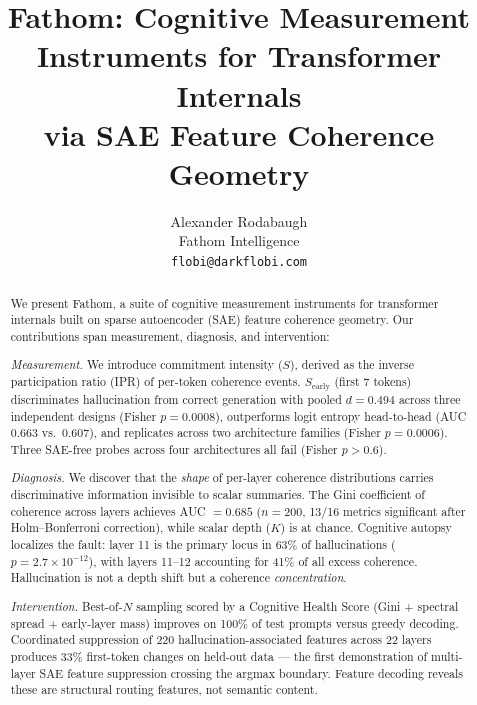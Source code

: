 \documentclass{article}
\title{Fathom: Cognitive Measurement Instruments for Transformer Internals \\
via SAE Feature Coherence Geometry}
\author{
  Alexander Rodabaugh \\
  Fathom Intelligence \\
  \texttt{flobi@darkflobi.com}
}
\begin{document}
\maketitle

\begin{abstract}
We present Fathom, a suite of cognitive measurement instruments
for transformer internals built on sparse autoencoder (SAE) feature
coherence geometry. Our contributions span measurement, diagnosis,
and intervention:

\textit{Measurement.} We introduce commitment intensity ($S$), derived
as the inverse participation ratio (IPR) of per-token coherence events.
$S_\text{early}$ (first 7 tokens) discriminates hallucination from
correct generation with pooled $d = 0.494$ across three independent
designs (Fisher $p = 0.0008$), outperforms logit entropy head-to-head
(AUC $0.663$ vs.\ $0.607$), and replicates across two architecture
families (Fisher $p = 0.0006$). Three SAE-free probes across four
architectures all fail (Fisher $p > 0.6$).

\textit{Diagnosis.} We discover that the \textit{shape} of per-layer
coherence distributions carries discriminative information invisible
to scalar summaries. The Gini coefficient of coherence across layers
achieves AUC $= 0.685$ ($n = 200$, 13/16 metrics significant after
Holm--Bonferroni correction), while scalar depth ($K$) is at chance.
Cognitive autopsy localizes the fault: layer 11 is the primary locus
in 63\% of hallucinations ($p = 2.7 \times 10^{-12}$), with layers
11--12 accounting for 41\% of all excess coherence. Hallucination is
not a depth shift but a coherence \textit{concentration}.

\textit{Intervention.} Best-of-$N$ sampling scored by a Cognitive
Health Score (Gini + spectral spread + early-layer mass) improves
on 100\% of test prompts versus greedy decoding. Coordinated
suppression of 220 hallucination-associated features across 22 layers
produces 33\% first-token changes on held-out data --- the first
demonstration of multi-layer SAE feature suppression crossing the
argmax boundary. Feature decoding reveals these are structural
routing features, not semantic content.


\end{abstract}
\end{document}
